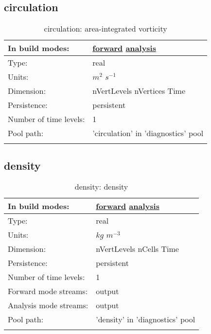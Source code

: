 \subsection[circulation]{circulation}
\label{subsec:var_sec_diagnostics_circulation}
\begin{center}
\begin{longtable}{| p{2.0in} | p{4.0in} |}
        \hline 
        In build modes: & \hyperref[subsec:forward_var_tab_diagnostics]{forward} \hyperref[subsec:analysis_var_tab_diagnostics]{analysis} \\
        \hline 
        Type: & real \\
        \hline 
        Units: & $m^2$ $s^{-1}$ \\
        \hline 
        Dimension: & nVertLevels nVertices Time \\
        \hline 
        Persistence: & persistent \\
        \hline 
        Number of time levels: & 1 \\
        \hline 
            Pool path: & 'circulation' in 'diagnostics' pool
 \\
		 \hline 
    \caption{circulation: area-integrated vorticity}
\end{longtable}
\end{center}
\subsection[density]{density}
\label{subsec:var_sec_diagnostics_density}
\begin{center}
\begin{longtable}{| p{2.0in} | p{4.0in} |}
        \hline 
        In build modes: & \hyperref[subsec:forward_var_tab_diagnostics]{forward} \hyperref[subsec:analysis_var_tab_diagnostics]{analysis} \\
        \hline 
        Type: & real \\
        \hline 
        Units: & $kg$ $m^{-3}$ \\
        \hline 
        Dimension: & nVertLevels nCells Time \\
        \hline 
        Persistence: & persistent \\
        \hline 
        Number of time levels: & 1 \\
        \hline 
		 Forward mode streams: &  output \\
        \hline 
		 Analysis mode streams: &  output \\
        \hline 
            Pool path: & 'density' in 'diagnostics' pool
 \\
		 \hline 
    \caption{density: density}
\end{longtable}
\end{center}
